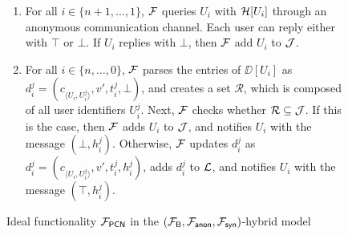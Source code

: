 \begin{figure*}[!t]
{{\begin{enumerate}
	\item For all $i \in \{n+1,\ldots,1\}$, $\mathcal{F}$ queries $U_i$ with $\mathcal{H}[U_i]$ through an 
	anonymous communication channel. Each user can reply either with $\top$ or $\bot$. If 
	$U_i$ replies with $\bot$, then $\mathcal{F}$ add $U_i$ to $\mathcal{J}$.
	
	\item For all $i \in \{n,\ldots,0\}$, $\mathcal{F}$ parses the entries of $\DD[U_i]$ as 
	$d_i^j = (c_{\langle U_i,U_i^j \rangle}, v', t_i^j, \bot)$, and creates a set 
	$\mathcal{R}$, which is composed of all user identifiers $U_i^j$. Next, $\mathcal{F}$ checks 
	whether $\mathcal{R} \subseteq \mathcal{J}$. If this is the case, then $\mathcal{F}$ adds $U_i$ to $\mathcal{J}$, 
	and notifies $U_i$ with the message $(\bot, h_i^j)$. Otherwise, $\mathcal{F}$ updates $d_i^j$ as 
	$d_i^j = (c_{\langle U_i,U_i^j \rangle}, v', t_i^j, h_i^j)$, adds $d_i^j$ to $\mathcal{L}$, and 
	notifies $U_i$ with the message $(\top, h_i^j)$.
\end{enumerate}
}}
\caption{Ideal functionality $\mathcal{F}_{\mathsf{PCN}}$ in the 
$(\mathcal{F}_{\mathsf{B}}, \mathcal{F}_{\mathsf{anon}}, \mathcal{F}_{\mathsf{syn}})$-hybrid model}
\label{fig:pcn}
\end{figure*}

